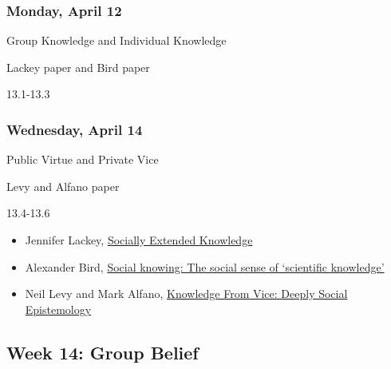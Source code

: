 \documentclass[
]{article}
\providecommand{\tightlist}{%
  \setlength{\itemsep}{0pt}\setlength{\parskip}{0pt}}
\begin{document}
\begin{multicols}{2}

\hypertarget{monday-april-12}{%
\subsubsection{Monday, April 12}\label{monday-april-12}}

\begin{description}
\tightlist
\item[Topic]
Group Knowledge and Individual Knowledge
\item[Reading]
Lackey paper and Bird paper
\item[Lectures]
13.1-13.3
\end{description}

\hypertarget{wednesday-april-14}{%
\subsubsection{Wednesday, April 14}\label{wednesday-april-14}}

\begin{description}
\tightlist
\item[Topic]
Public Virtue and Private Vice
\item[Reading]
Levy and Alfano paper
\item[Lectures]
13.4-13.6
\end{description}

\end{multicols}

\begin{itemize}
\tightlist
\item
  Jennifer Lackey, \href{https://philpapers.org/rec/LACSEK}{Socially
  Extended Knowledge}
\item
  Alexander Bird, \href{https://philpapers.org/rec/BIRSKT}{Social
  knowing: The social sense of `scientific knowledge'}
\item
  Neil Levy and Mark Alfano,
  \href{https://philpapers.org/rec/LEVKFV}{Knowledge From Vice: Deeply
  Social Epistemology}
\end{itemize}

\hypertarget{week-14-group-belief}{%
\subsection{Week 14: Group Belief}\label{week-14-group-belief}}
\end{document}
